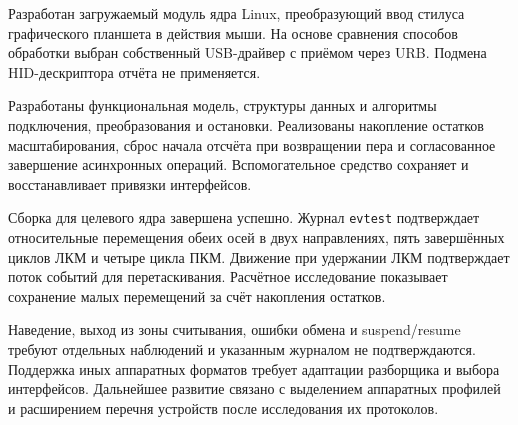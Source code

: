 
Разработан загружаемый модуль ядра Linux, преобразующий ввод стилуса графического планшета в действия мыши. На основе сравнения способов обработки выбран собственный USB-драйвер с приёмом через URB. Подмена HID-дескриптора отчёта не применяется.

Разработаны функциональная модель, структуры данных и алгоритмы подключения, преобразования и остановки. Реализованы накопление остатков масштабирования, сброс начала отсчёта при возвращении пера и согласованное завершение асинхронных операций. Вспомогательное средство сохраняет и восстанавливает привязки интерфейсов.

Сборка для целевого ядра завершена успешно. Журнал \texttt{evtest} подтверждает относительные перемещения обеих осей в двух направлениях, пять завершённых циклов ЛКМ и четыре цикла ПКМ. Движение при удержании ЛКМ подтверждает поток событий для перетаскивания. Расчётное исследование показывает сохранение малых перемещений за счёт накопления остатков.

Наведение, выход из зоны считывания, ошибки обмена и suspend/resume требуют отдельных наблюдений и указанным журналом не подтверждаются. Поддержка иных аппаратных форматов требует адаптации разборщика и выбора интерфейсов. Дальнейшее развитие связано с выделением аппаратных профилей и расширением перечня устройств после исследования их протоколов.
\clearpage
